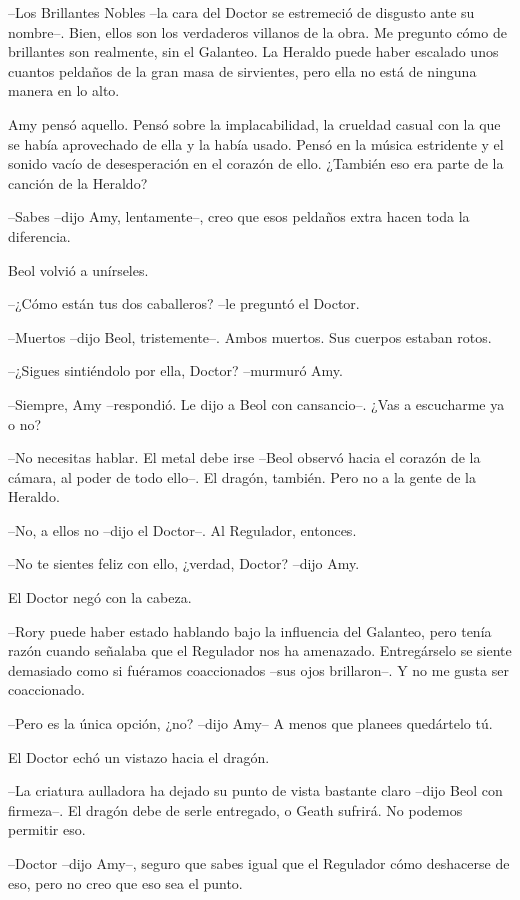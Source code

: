 {--Los Brillantes Nobles --la cara del Doctor se estremeció de
	disgusto ante su nombre--. Bien, ellos son los verdaderos villanos de la
	obra. Me pregunto cómo de brillantes son realmente, sin el Galanteo. La
	Heraldo puede haber escalado unos cuantos peldaños de la gran masa de
sirvientes, pero ella no está de ninguna manera en lo alto.}

{Amy pensó aquello. Pensó sobre la implacabilidad, la crueldad casual
	con la que se había aprovechado de ella y la había usado. Pensó en la
	música estridente y el sonido vacío de desesperación en el corazón de
ello. ¿También eso era parte de la canción de la Heraldo?}

{--Sabes --dijo Amy, lentamente--, creo que esos peldaños extra hacen
toda la diferencia.}

{Beol volvió a unírseles.}

{--¿Cómo están tus dos caballeros? --le preguntó el Doctor.}

{--Muertos --dijo Beol, tristemente--. Ambos muertos. Sus cuerpos
estaban rotos.}

{--¿Sigues sintiéndolo por ella, Doctor? --murmuró Amy.}

{--Siempre, Amy --respondió. Le dijo a Beol con cansancio--. ¿Vas a
escucharme ya o no?}

{--No necesitas hablar. El metal debe irse --Beol observó hacia el
	corazón de la cámara, al poder de todo ello--. El dragón, también. Pero
no a la gente de la Heraldo.}

{--No, a ellos no --dijo el Doctor--. Al Regulador, entonces.}

{--No te sientes feliz con ello, ¿verdad, Doctor? --dijo Amy.}

{El Doctor negó con la cabeza.}

{--Rory puede haber estado hablando bajo la influencia del Galanteo,
	pero tenía razón cuando señalaba que el Regulador nos ha amenazado.
	Entregárselo se siente demasiado como si fuéramos coaccionados --sus
ojos brillaron--. Y no me gusta ser coaccionado.}

{--Pero es la única opción, ¿no? --dijo Amy-- A menos que planees
quedártelo tú.}

{El Doctor echó un vistazo hacia el dragón.}

{--La criatura aulladora ha dejado su punto de vista bastante claro
	--dijo Beol con firmeza--. El dragón debe de serle entregado, o Geath
sufrirá. No podemos permitir eso.}

{--Doctor --dijo Amy--, seguro que sabes igual que el Regulador cómo
deshacerse de eso, pero no creo que eso sea el punto.}

